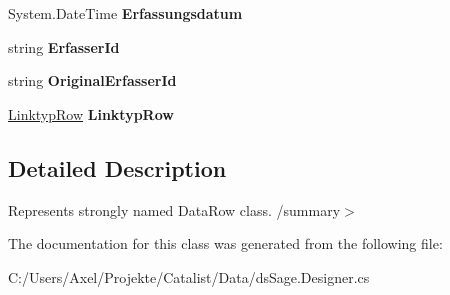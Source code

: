 \begin{DoxyCompactItemize}
\item 
System.\+Date\+Time {\bfseries Erfassungsdatum}\hypertarget{class_products_1_1_data_1_1ds_sage_1_1_historie_row_a8e2bf5d85d73ab0f013ebbf7a5ad02f3}{}\label{class_products_1_1_data_1_1ds_sage_1_1_historie_row_a8e2bf5d85d73ab0f013ebbf7a5ad02f3}

\item 
string {\bfseries Erfasser\+Id}\hypertarget{class_products_1_1_data_1_1ds_sage_1_1_historie_row_adde1d9637ee07f7dabf35166980c99a2}{}\label{class_products_1_1_data_1_1ds_sage_1_1_historie_row_adde1d9637ee07f7dabf35166980c99a2}

\item 
string {\bfseries Original\+Erfasser\+Id}\hypertarget{class_products_1_1_data_1_1ds_sage_1_1_historie_row_a557f1698f03aa2c166ac34737edb7ab0}{}\label{class_products_1_1_data_1_1ds_sage_1_1_historie_row_a557f1698f03aa2c166ac34737edb7ab0}

\item 
\hyperlink{class_products_1_1_data_1_1ds_sage_1_1_linktyp_row}{Linktyp\+Row} {\bfseries Linktyp\+Row}\hypertarget{class_products_1_1_data_1_1ds_sage_1_1_historie_row_af2441d6ab95a522a667b1ebd2fd52b57}{}\label{class_products_1_1_data_1_1ds_sage_1_1_historie_row_af2441d6ab95a522a667b1ebd2fd52b57}

\end{DoxyCompactItemize}


\subsection{Detailed Description}
Represents strongly named Data\+Row class. /summary$>$ 

The documentation for this class was generated from the following file\+:\begin{DoxyCompactItemize}
\item 
C\+:/\+Users/\+Axel/\+Projekte/\+Catalist/\+Data/ds\+Sage.\+Designer.\+cs\end{DoxyCompactItemize}
